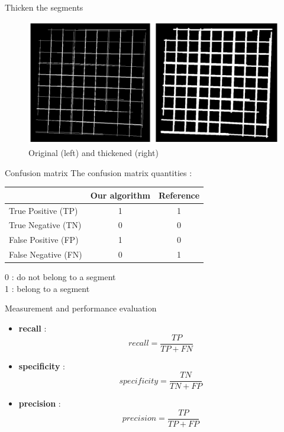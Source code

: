 \documentclass[12pt, dvipsnames]{beamer}
\begin{document}
\begin{frame}{Thicken the segments}
    \begin{figure}
        \centering
        \includegraphics[width=\textwidth]{resources/png/thicken-image.png}
        \caption{Original (left) and thickened (right)}
    \end{figure}
\end{frame}

\begin{frame}{Confusion matrix}
    The confusion matrix quantities :
    \begin{table}
        \centering
        \begin{tabular}{|l|c|c|}
            \hline
            & {\bf Our algorithm} & {\bf Reference}\\ \hline
            \hline
            {\bf} True Positive (TP) & \cellcolor{green!25}1 & \cellcolor{green!25}1\\ \hline
            {\bf} True Negative (TN) & \cellcolor{red!25}0 & \cellcolor{red!25}0\\ \hline
            \hline
            {\bf} False Positive (FP) & \cellcolor{green!25}1 & \cellcolor{red!25}0\\ \hline
            {\bf} False Negative (FN) & \cellcolor{red!25}0 & \cellcolor{green!25}1\\ \hline
        \end{tabular}
    \end{table}
    0 : do not belong to a segment\\
    1 : belong to a segment
\end{frame}

\begin{frame}{Measurement and performance evaluation}
    \begin{itemize}
        \item {\bf recall} :
        $$
        recall = \frac{TP}{TP + FN}
        $$
        \item {\bf specificity} :
        $$
        specificity = \frac{TN}{TN + FP}
        $$
        \item {\bf precision} :
        $$
        precision = \frac{TP}{TP + FP}
        $$
    \end{itemize}
\end{frame}
\end{document}
